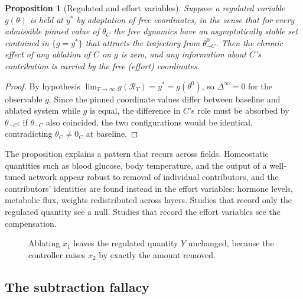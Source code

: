 \documentclass[11pt]{article}
\newtheorem{proposition}[theorem]{Proposition}
\theoremstyle{definition}
\theoremstyle{remark}
\newcommand{\Rop}{\mathcal{R}}
\begin{document}
\begin{proposition}[Regulated and effort variables]\label{prop:effort}
Suppose a regulated variable $g(\theta)$ is held at $y^*$ by adaptation of free coordinates, in the sense that for every admissible pinned value of $\theta_C$ the free dynamics have an asymptotically stable set contained in $\{g=y^*\}$ that attracts the trajectory from $\theta^0_{-C}$. Then the chronic effect of any ablation of $C$ on $g$ is zero, and any information about $C$'s contribution is carried by the free (effort) coordinates.
\end{proposition}
\begin{proof}
By hypothesis $\lim_{T\to\infty}g(\Rop_T)=y^*=g(\theta^0)$, so $\Delta^\infty=0$ for the observable $g$. Since the pinned coordinate values differ between baseline and ablated system while $g$ is equal, the difference in $C$'s role must be absorbed by $\theta_{-C}$: if $\theta_{-C}$ also coincided, the two configurations would be identical, contradicting $\theta_C\ne 0_C$ at baseline.
\end{proof}

The proposition explains a pattern that recurs across fields. Homeostatic quantities such as blood glucose, body temperature, and the output of a well-tuned network appear robust to removal of individual contributors, and the contributors' identities are found instead in the effort variables: hormone levels, metabolic flux, weights redistributed across layers. Studies that record only the regulated quantity see a null. Studies that record the effort variables see the compensation.

\begin{figure}[h]
\centering
{}
\caption{Ablating $x_1$ leaves the regulated quantity $Y$ unchanged, because the controller raises $x_2$ by exactly the amount removed.}
\end{figure}

\subsection{The subtraction fallacy}
\end{document}
